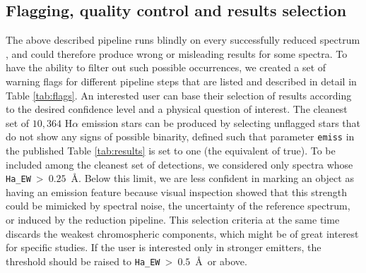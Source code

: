 
\subsection{Flagging, quality control and results selection}
\label{sec:flagging}
The above described pipeline runs blindly on every successfully reduced spectrum \citep[\texttt{guess\_flag} = 0, for details see][]{2017MNRAS.464.1259K}, and could therefore produce wrong or misleading results for some spectra. To have the ability to filter out such possible occurrences, we created a set of warning flags for different pipeline steps that are listed and described in detail in Table \ref{tab:flags}. An interested user can base their selection of results according to the desired confidence level and a physical question of interest. The cleanest set of $10,364$ H$\alpha$ emission stars can be produced by selecting unflagged stars that do not show any signs of possible binarity, defined such that parameter \texttt{emiss} in the published Table \ref{tab:results} is set to one (the equivalent of true). To be included among the cleanest set of detections, we considered only spectra whose \texttt{Ha\_EW}~>~$0.25$~\AA. Below this limit, we are less confident in marking an object as having an emission feature because visual inspection showed that this strength could be mimicked by spectral noise, the uncertainty of the reference spectrum, or induced by the reduction pipeline. This selection criteria at the same time discards the weakest chromospheric components, which might be of great interest for specific studies. If the user is interested only in stronger emitters, the threshold should be raised to \texttt{Ha\_EW}~>~$0.5$~\AA\ or above.

